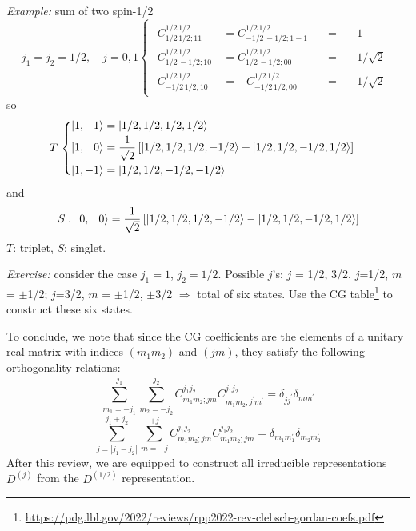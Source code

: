 \documentclass[12pt]{article}
\newcommand{\be}{\begin{equation}}
\newcommand{\ee}{\end{equation}}
\begin{document}
\emph{Example:} sum of two spin-1/2
\be
j_1 = j_2 = 1/2,
\quad
j = 0,1
\begin{cases}
\begin{aligned}
C^{1/2\,1/2}_{1/2\,1/2;11} &\,=  C^{1/2\,1/2}_{-1/2\,-1/2;1-1} &\quad=& \quad 1\\
C^{1/2\,1/2}_{1/2\,-1/2;10} &\,=  C^{1/2\,1/2}_{1/2\,-1/2;00} &\quad=& \quad 1/\sqrt{2}\\ 
C^{1/2\,1/2}_{-1/2\,1/2;10} &\,=  -C^{1/2\,1/2}_{-1/2\,1/2;00} &\quad=& \quad 1/\sqrt{2}
\end{aligned}
\end{cases}
\ee
so
\be
T\,
\begin{cases}
\begin{aligned}
\ket{1,\phantom{-}1} &= \ket{1/2,1/2,1/2,1/2}\\
\ket{1,\phantom{-}0} &= \frac{1}{\sqrt 2}
\left[\ket{1/2,1/2,1/2,-1/2} + \ket{1/2,1/2,-1/2,1/2}\right]\\
\ket{1,-1} &= \ket{1/2,1/2,-1/2,-1/2}\\
\end{aligned}
\end{cases}
\ee
and
\be
S:\,
\ket{0,\phantom{-}0} = \frac{1}{\sqrt 2}
\left[\ket{1/2,1/2,1/2,-1/2} - \ket{1/2,1/2,-1/2,1/2}\right]
\ee
$T$: triplet, $S$: singlet.



\emph{Exercise:} consider the case $j_1 = 1$, $j_2 = 1/2$.
Possible $j$'s: $j$ = 1/2, 3/2.
$j$=1/2, $m$ = $\pm$1/2;  
$j$=3/2, $m$ = $\pm$1/2, $\pm$3/2
$\Rightarrow$ total of six states.
Use the CG table\footnote{\url{https://pdg.lbl.gov/2022/reviews/rpp2022-rev-clebsch-gordan-coefs.pdf}}
to construct these six states.

To conclude, we note that since the CG coefficients
are the elements of a unitary real matrix with
indices $(m_1m_2)$ and $(jm)$, they satisfy the following
orthogonality relations:
\be
\sum_{m_{1}=-j_{1}}^{j_{1}} \sum_{m_{2}=-j_{2}}^{j_{2}} C_{m_{1} m_{2} ; j m}^{j_{1} j_{2}} C_{m_{1} m_{2} ; j^\prime m^\prime}^{j_{1} j_{2}}=\delta_{j j^{\prime}} \delta_{m m^\prime}
\ee
\be
\sum_{j=\left|j_{1}-j_{2}\right|}^{j_{1}+j_{2}} \sum_{m=-j}^{+j} C_{m_{1} m_{2} ; j m}^{j_{1} j_{2}} C_{m_{1} m_{2} ; j m}^{j_{1} j_{2}}=\delta_{m_{1} m_{1}^{\prime}} \delta_{m_{2} m_{2}^\prime}
\ee
After this review, we are equipped to construct all irreducible representations $D^{(j)}$ from the $D^{(1/2)}$
representation.

\end{document}
